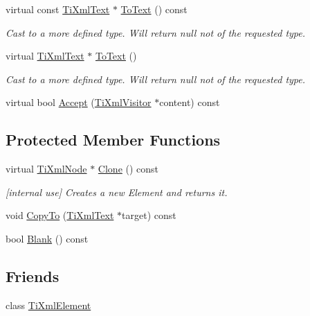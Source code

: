 \begin{DoxyCompactItemize}
\item 
virtual const \hyperlink{class_ti_xml_text}{Ti\+Xml\+Text} $\ast$ \hyperlink{class_ti_xml_text_a895bf34ffad17f7439ab2a52b9651648}{To\+Text} () const 
\begin{DoxyCompactList}\small\item\em Cast to a more defined type. Will return null not of the requested type. \end{DoxyCompactList}\item 
virtual \hyperlink{class_ti_xml_text}{Ti\+Xml\+Text} $\ast$ \hyperlink{class_ti_xml_text_ae7c3a8fd3e4dbf6c0c4363a943d72f5b}{To\+Text} ()
\begin{DoxyCompactList}\small\item\em Cast to a more defined type. Will return null not of the requested type. \end{DoxyCompactList}\item 
virtual bool \hyperlink{class_ti_xml_text_a43b9954ebf679557fac1a4453f337b7c}{Accept} (\hyperlink{class_ti_xml_visitor}{Ti\+Xml\+Visitor} $\ast$content) const 
\end{DoxyCompactItemize}
\subsection*{Protected Member Functions}
\begin{DoxyCompactItemize}
\item 
virtual \hyperlink{class_ti_xml_node}{Ti\+Xml\+Node} $\ast$ \hyperlink{class_ti_xml_text_adde1869dfb029be50713fbfd8ce4d21f}{Clone} () const 
\begin{DoxyCompactList}\small\item\em \mbox{[}internal use\mbox{]} Creates a new Element and returns it. \end{DoxyCompactList}\item 
void \hyperlink{class_ti_xml_text_adcec7d9b6fccfc5777452bb97e6031c1}{Copy\+To} (\hyperlink{class_ti_xml_text}{Ti\+Xml\+Text} $\ast$target) const 
\item 
bool \hyperlink{class_ti_xml_text_a1c120428e3b3cf24d79706e6d2b65aa6}{Blank} () const 
\end{DoxyCompactItemize}
\subsection*{Friends}
\begin{DoxyCompactItemize}
\item 
class \hyperlink{class_ti_xml_text_ab6592e32cb9132be517cc12a70564c4b}{Ti\+Xml\+Element}
\end{DoxyCompactItemize}
